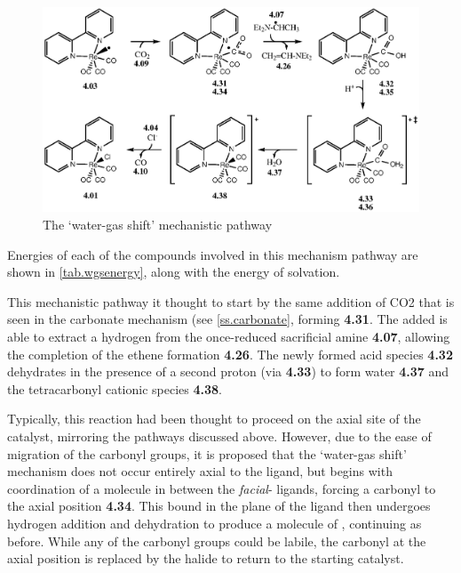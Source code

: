 \begin{figure}[!htb]
 \begin{center}
  \includegraphics[clip=true, width=\textwidth, keepaspectratio]{images/watergas.eps}
 \end{center}
\caption{The `water-gas shift' mechanistic pathway}
\label{fig.watergas}
\end{figure} 

Energies of each of the compounds involved in this mechanism pathway are shown in \autoref{tab.wgsenergy}, along with the energy of solvation.




This mechanistic pathway it thought to start by the same addition of CO2 that is seen in the carbonate mechanism (see \autoref{ss.carbonate}, forming \textbf{4.31}. The added  is able to extract a hydrogen from the once-reduced sacrificial amine \textbf{4.07}, allowing the completion of the ethene formation \textbf{4.26}. The newly formed acid species \textbf{4.32} dehydrates in the presence of a second proton (via \textbf{4.33}) to form water \textbf{4.37} and the tetracarbonyl cationic species \textbf{4.38}. 

Typically, this reaction had been thought to proceed on the axial site of the catalyst, mirroring the pathways discussed above. However, due to the ease of migration of the carbonyl groups, it is proposed that the `water-gas shift' mechanism does not occur entirely axial to the ligand, but begins with coordination of a  molecule in between the \textit{facial}- ligands, forcing a carbonyl to the axial position \textbf{4.34}. This  bound in the plane of the ligand then undergoes hydrogen addition and dehydration to produce a molecule of , continuing as before. While any of the carbonyl groups could be labile, the carbonyl at the axial position is replaced by the halide to return to the starting catalyst\autocite{shaver1992}. 

